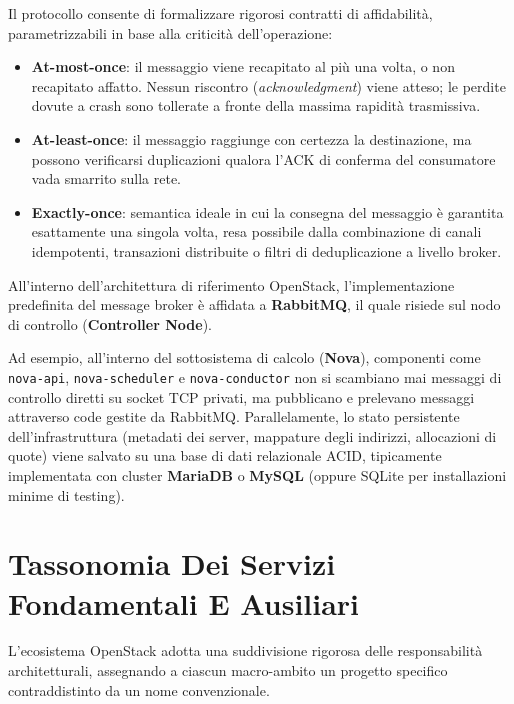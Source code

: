 \documentclass[11pt, a4paper]{article}
\begin{document}
Il protocollo consente di formalizzare rigorosi contratti di affidabilità, parametrizzabili in base alla criticità dell'operazione:
\begin{itemize}
    \item \textbf{At-most-once}: il messaggio viene recapitato al più una volta, o non recapitato affatto. Nessun riscontro (\emph{acknowledgment}) viene atteso; le perdite dovute a crash sono tollerate a fronte della massima rapidità trasmissiva.
    \item \textbf{At-least-once}: il messaggio raggiunge con certezza la destinazione, ma possono verificarsi duplicazioni qualora l'ACK di conferma del consumatore vada smarrito sulla rete.
    \item \textbf{Exactly-once}: semantica ideale in cui la consegna del messaggio è garantita esattamente una singola volta, resa possibile dalla combinazione di canali idempotenti, transazioni distribuite o filtri di deduplicazione a livello broker.
\end{itemize}

All'interno dell'architettura di riferimento OpenStack, l'implementazione predefinita del message broker è affidata a \textbf{RabbitMQ}, il quale risiede sul nodo di controllo (\textbf{Controller Node}).

Ad esempio, all'interno del sottosistema di calcolo (\textbf{Nova}), componenti come \texttt{nova-api}, \texttt{nova-scheduler} e \texttt{nova-conductor} non si scambiano mai messaggi di controllo diretti su socket TCP privati, ma pubblicano e prelevano messaggi attraverso code gestite da RabbitMQ. Parallelamente, lo stato persistente dell'infrastruttura (metadati dei server, mappature degli indirizzi, allocazioni di quote) viene salvato su una base di dati relazionale ACID, tipicamente implementata con cluster \textbf{MariaDB} o \textbf{MySQL} (oppure SQLite per installazioni minime di testing).

\newpage


\section{Tassonomia Dei Servizi Fondamentali E Ausiliari}

L'ecosistema OpenStack adotta una suddivisione rigorosa delle responsabilità architetturali, assegnando a ciascun macro-ambito un progetto specifico contraddistinto da un nome convenzionale.
\end{document}
